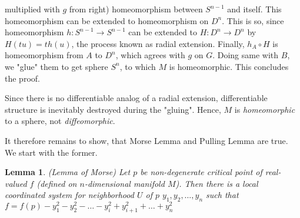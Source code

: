 \documentclass[8pt]{article} %
\newtheorem{lemma}[theorem]{Lemma}
\newenvironment{remark}[1][Remark]{\begin{trivlist}
\item[\hskip \labelsep {\bfseries #1}]}{\end{trivlist}}
\begin{document}
multiplied with $g$ from right) homeomorphism between
$S^{n-1}$ and itself. This homeomorphism can be extended to homeomorphism on $D^n$. This is so, since homeomorphism $h:S^{n-1}\rightarrow S^{n-1}$ can be extended to $H:D^n\rightarrow D^n$ by $H(tu)=th(u)$, the process known as
radial extension. Finally, $h_A\circ H$ is homeomorphism from $A$ to $D^n$, which agrees with $g$ on $G$. Doing same with $B$, we "glue" them to get sphere $S^n$, to which $M$ is homeomorphic. This concludes the proof.\\
\begin{remark}
	Since there is no differentiable analog of a radial extension, differentiable structure is inevitably destroyed during the "gluing". Hence, $M$ is \textit{homeomorphic} to a sphere, not \textit{diffeomorphic}.
\end{remark}
It therefore remains to show, that Morse Lemma and Pulling Lemma are true. We start with the former.
\begin{lemma}{(Lemma of Morse) }Let $p$ be non-degenerate critical point of real-valued $f$ (defined on $n$-dimensional manifold $M$). Then there is a local coordinated system for neighborhood $U$ of $p$ $y_1,y_2,\dots,y_n$ such that
	$f=f(p)-y_1^2-y_2^2-\dots-y_i^2+y_{i+1}^2+\dots+y_n^2$
\end{lemma}
\end{document}
